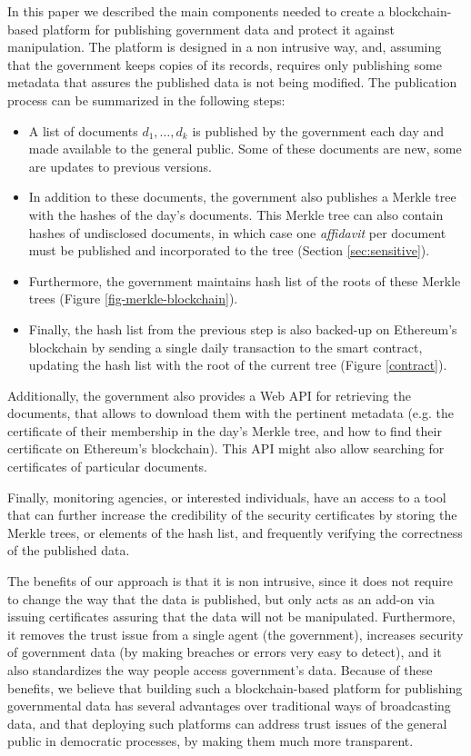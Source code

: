 
In this paper we described the main components needed to create a blockchain-based platform for publishing government data and protect it against manipulation. The platform is designed in a non intrusive way, and, assuming that the government keeps copies of its records, requires only publishing some metadata that assures the published data is not being modified. The publication process can be summarized in the following steps:
\begin{itemize}
\item A list of documents $d_1,\ldots ,d_k$ is published by the government each day and made available to the general public. Some of these documents are new, some are updates to previous versions.
\item In addition to these documents, the government also publishes a Merkle tree with the hashes of the day's documents. This Merkle tree can also contain hashes of undisclosed documents, in which case one \textit{affidavit} per document must be published and incorporated to the tree (Section \ref{sec:sensitive}).
\item Furthermore, the government maintains hash list of the roots of these Merkle trees (Figure \ref{fig-merkle-blockchain}).
\item Finally, the hash list from the previous step is also backed-up on Ethereum's blockchain by sending a single daily transaction to the smart contract, updating the hash list with the root of the current tree (Figure \ref{contract}).
\end{itemize}

Additionally, the government also provides a Web API for retrieving the documents, that allows to download them with the pertinent metadata (e.g. the certificate of their membership in the day's Merkle tree, and how to find their certificate on Ethereum's blockchain). This API might also allow searching for certificates of particular documents.

Finally, monitoring agencies, or interested individuals, have an access to a tool that can further increase the credibility of the security certificates by storing the Merkle trees, or elements of the hash list, and frequently verifying the correctness of the published data.

The benefits of our approach is that it is non intrusive, since it does not require to change the way that the data is published, but only acts as an add-on via issuing certificates assuring that the data will not be manipulated. Furthermore, it removes the trust issue from a single agent (the government), increases security of government data (by making breaches or errors very easy to detect), and it also standardizes the way people access government's data. Because of these benefits, we believe that building such a blockchain-based platform for publishing governmental data has several advantages over traditional ways of broadcasting data, and that deploying such platforms can address trust issues of the general public in democratic processes, by making them much more transparent.